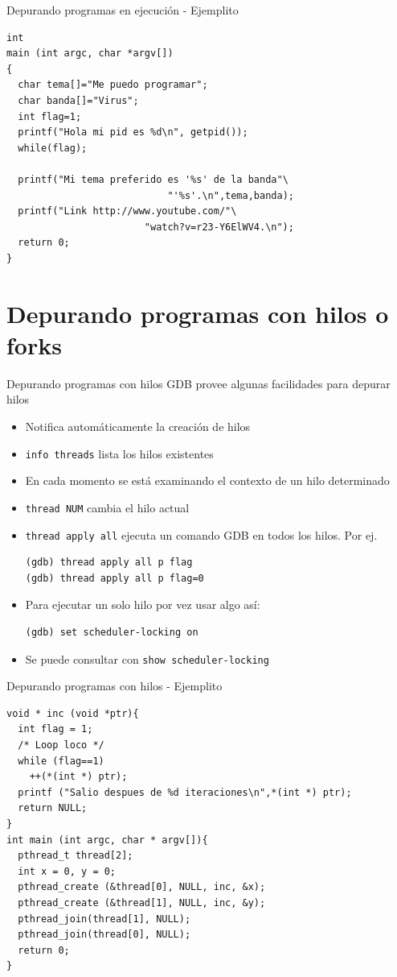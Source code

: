\documentclass[xetex]{beamer}
\begin{document}
\begin{frame}[fragile]{Depurando programas en ejecución - Ejemplito}
\begin{lstlisting}
int
main (int argc, char *argv[])
{
  char tema[]="Me puedo programar";
  char banda[]="Virus";
  int flag=1;
  printf("Hola mi pid es %d\n", getpid());
  while(flag);

  printf("Mi tema preferido es '%s' de la banda"\
                            "'%s'.\n",tema,banda);
  printf("Link http://www.youtube.com/"\
                        "watch?v=r23-Y6ElWV4.\n");
  return 0;
}
\end{lstlisting}
\end{frame}

\section{Depurando programas con hilos o forks}

\begin{frame}[fragile]{Depurando programas con hilos}
GDB provee algunas facilidades para depurar hilos
\begin{itemize}
\item Notifica automáticamente la creación de hilos
\item \verb=info threads= lista los hilos existentes
\item En cada momento se está examinando el contexto de un hilo determinado
\item \verb=thread NUM= cambia el hilo actual
\item \verb=thread apply all= ejecuta un comando GDB en todos los hilos. Por ej.
\begin{verbatim}
(gdb) thread apply all p flag
(gdb) thread apply all p flag=0
\end{verbatim}
\item Para ejecutar un solo hilo por vez usar algo así:
\begin{verbatim}
(gdb) set scheduler-locking on
\end{verbatim}
\item Se puede consultar con \verb=show scheduler-locking=
\end{itemize}
\end{frame}


\begin{frame}[fragile]{Depurando programas con hilos - Ejemplito}
\begin{lstlisting}
void * inc (void *ptr){
  int flag = 1;
  /* Loop loco */
  while (flag==1)
    ++(*(int *) ptr);
  printf ("Salio despues de %d iteraciones\n",*(int *) ptr);
  return NULL;
}
int main (int argc, char * argv[]){
  pthread_t thread[2];
  int x = 0, y = 0;
  pthread_create (&thread[0], NULL, inc, &x);
  pthread_create (&thread[1], NULL, inc, &y);
  pthread_join(thread[1], NULL);
  pthread_join(thread[0], NULL);
  return 0;
}
\end{lstlisting}
\end{frame}
\end{document}
